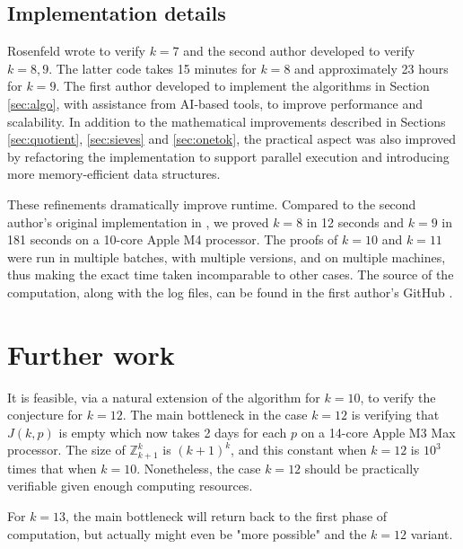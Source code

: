 \documentclass[11pt]{amsart}
\newcommand{\Z}{\mathbb{Z}}
\theoremstyle{definition}
\theoremstyle{remark}
\begin{document}
\subsection{Implementation details}
Rosenfeld wrote \cite{rosenfeldcode} to verify $k=7$ and the second author developed \cite{tanupatcode} to verify $k=8,9$. 
The latter code takes 
15 minutes for $k=8$ and approximately 23 hours for $k=9$. 
The first author developed \cite{mycode} to implement the algorithms in Section \ref{sec:algo}, with assistance from AI-based tools, 
to improve performance and scalability. In addition to the mathematical improvements described in Sections \ref{sec:quotient}, 
\ref{sec:sieves} and \ref{sec:onetok}, the practical aspect was also improved by refactoring the implementation to support parallel
execution and introducing more memory-efficient data structures.

These refinements dramatically improve runtime. Compared to the second author's original implementation in \cite{Trakulthongchai}, 
we proved $k=8$ in 12 seconds and $k=9$ in 181 seconds on a 10-core Apple M4 processor. 
The proofs of $k=10$ and $k=11$ were run in multiple batches, with multiple versions, and on multiple machines, 
thus making the exact time taken incomparable to other cases. The source of the computation, along with the log files, 
can be found in the first author's GitHub \cite{mycode}.

\section{Further work}
\label{sec:further}
It is feasible, via a natural extension of the algorithm for $k=10$, to verify the conjecture for $k=12$.
The main bottleneck in the case $k=12$ is verifying that $J(k,p)$ is empty which now takes 2 days for each $p$ on a 14-core
Apple M3 Max processor. The size of $\Z_{k+1}^k$ is $(k+1)^k$, and this constant when $k=12$ is $10^3$ times that when $k=10$.
Nonetheless, the case $k=12$ should be practically verifiable given enough computing resources.

For $k=13$, the main bottleneck will return back to the first phase of computation, but actually might even be "more possible"
and the $k=12$ variant. 



\end{document}
